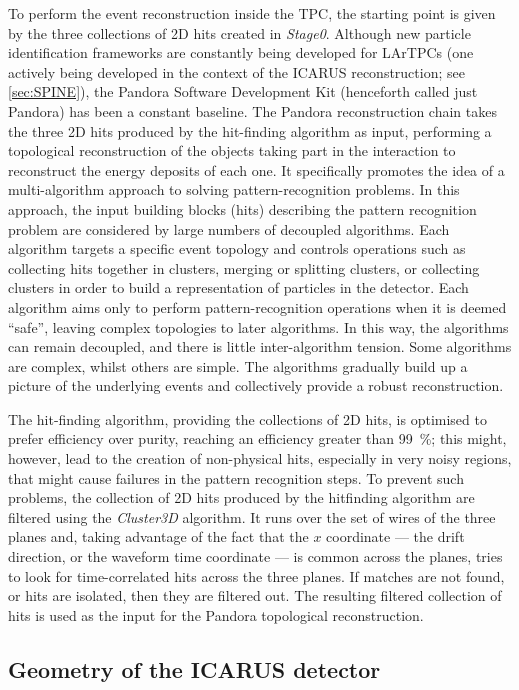 To perform the event reconstruction inside the TPC, the starting point is given by the three collections of 2D hits created in \emph{Stage0}. Although new particle identification frameworks are constantly being developed for LArTPCs (one actively being developed in the context of the ICARUS reconstruction; see \autoref{sec:SPINE}), the Pandora Software Development Kit \cite{MicroBooNE:2017xvs} (henceforth called just Pandora) has been a constant baseline. The Pandora reconstruction chain takes the three 2D hits produced by the hit-finding algorithm as input, performing a topological reconstruction of the objects taking part in the interaction to reconstruct the energy deposits of each one. It specifically promotes the idea of a multi-algorithm approach to solving pattern-recognition problems. In this approach, the input building blocks (hits) describing the pattern recognition problem are considered by large numbers of decoupled algorithms. Each algorithm targets a specific event topology and controls operations such as collecting hits together in clusters, merging or splitting clusters, or collecting clusters in order to build a representation of particles in the detector. Each algorithm aims only to perform pattern-recognition operations when it is deemed ``safe'', leaving complex topologies to later algorithms. In this way, the algorithms can remain decoupled, and there is little inter-algorithm tension. Some algorithms are complex, whilst others are simple. The algorithms gradually build up a picture of the underlying events and collectively provide a robust reconstruction.
 
The hit-finding algorithm, providing the collections of 2D hits, is optimised to prefer efficiency over purity, reaching an efficiency greater than \SI{99}{\percent}; this might, however, lead to the creation of non-physical hits, especially in very noisy regions, that might cause failures in the pattern recognition steps. To prevent such problems, the collection of 2D hits produced by the hitfinding algorithm are filtered using the \emph{Cluster3D} algorithm. It runs over the set of wires of the three planes and, taking advantage of the fact that the $x$ coordinate --- the drift direction, or the waveform time coordinate --- is common across the planes, tries to look for time-correlated hits across the three planes. If matches are not found, or hits are isolated, then they are filtered out. The resulting filtered collection of hits is used as the input for the Pandora topological reconstruction. 

\subsection{Geometry of the ICARUS detector}

